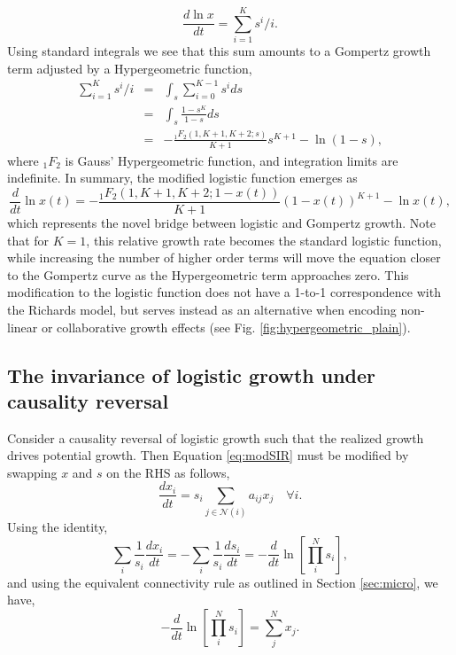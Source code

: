 \documentclass{article}
\begin{document}
\begin{equation}
\frac{d \ln{x}}{dt} = \sum_{i=1}^K s^i/i.
\end{equation}
Using standard integrals we see that this sum amounts to a Gompertz growth term adjusted by a Hypergeometric function,
\begin{eqnarray*}
  \sum_{i=1}^K s^i/i &=& \int_s \sum_{i=0}^{K-1} s^i ds\\
  &=&\int_s \frac{1-s^K}{1-s} ds\\
  &=&- \frac{{}_{1}F_{2}({1,K+1,K+2;s})}{K+1}s^{K+1} - \ln(1-s),
\end{eqnarray*}
where ${}_1F_{2}$ is Gauss' Hypergeometric function, and integration limits are indefinite. In summary, the modified logistic function emerges as
 \begin{equation}
 \label{eq:modLogistic2}
\frac{d}{dt}\ln{x(t)} = - \frac{{}_{1}F_{2}({1,K+1,K+2;1-x(t)})}{K+1}(1-x(t))^{K+1} - \ln{x(t)},
 \end{equation}
 which represents the novel bridge between logistic and Gompertz growth. Note that for $K=1$, this relative growth rate becomes the standard logistic function, while increasing the number of higher order terms will move the equation closer to the Gompertz curve as the Hypergeometric term approaches zero. This modification to the logistic function does not have a 1-to-1 correspondence with the Richards model, but serves instead as an alternative when encoding non-linear or collaborative growth effects (see Fig. \ref{fig:hypergeometric_plain}). 

\subsection{The invariance of logistic growth under causality reversal}
\label{appendix:swappinglogistic}
Consider a causality reversal of logistic growth such that the realized growth drives potential growth. Then Equation \ref{eq:modSIR} must be modified by swapping $x$ and $s$ on the RHS as follows,
\begin{equation}
\label{eq:revSIR}
\frac{d x_i}{dt} = s_i\sum_{j \in \mathcal{N}(i)}{a_{ij}}x_{j} \quad \forall i.
\end{equation}
Using the identity,
\begin{equation}
\label{eq:modSIR2app}
\sum_i\frac{1}{s_i}\frac{dx_i}{dt} = -\sum_i\frac{1}{s_i}\frac{ds_i}{dt} = -\frac{d}{dt} \ln \left[ \prod_i^N s_i \right ],
\end{equation}
and using the equivalent connectivity rule as outlined in Section \ref{sec:micro}, we have,
\begin{equation}
\label{eq:rev_id}
-\frac{d}{dt} \ln \left[ \prod_i^N s_i \right ] = \sum_j^N x_j.
\end{equation}
\end{document}
